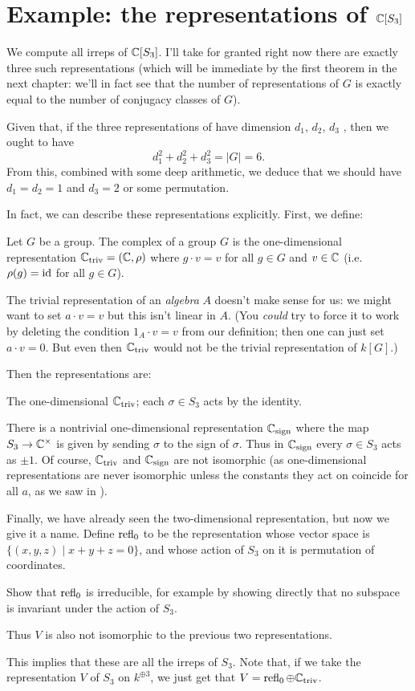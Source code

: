 \section{Example: the representations of $\mathbb C[S_3]$}
We compute all irreps of $\mathbb C[S_3]$.
I'll take for granted right now there are exactly three such representations
(which will be immediate by the first theorem in the next chapter:
we'll in fact see that the number of representations of $G$
is exactly equal to the number of conjugacy classes of $G$).

Given that, if the three representations of have dimension $d_1$, $d_2$, $d_3$ ,
then we ought to have
\[ d_1^2 + d_2^2 + d_3^2 = |G| = 6. \]
From this, combined with some deep arithmetic,
we deduce that we should have $d_1 = d_2 = 1$ and $d_3 = 2$
or some permutation.

In fact, we can describe these representations explicitly.
First, we define:
\begin{definition}
	Let $G$ be a group.
	The complex  of a group $G$
	is the one-dimensional representation $\mathbb C_{\mathrm{triv}} = (\mathbb C, \rho)$
	where $g \cdot v = v$ for all $g \in G$ and $v \in \mathbb C$
	(i.e.\ $\rho(g) = \mathrm{id}$ for all $g \in G$).
\end{definition}
\begin{remark}
	[Warning] The trivial representation of an \emph{algebra} $A$
	doesn't make sense for us:
	we might want to set $a \cdot v = v$ but this isn't linear in $A$.
	(You \emph{could} try to force it to work by
	deleting the condition $1_A \cdot v = v$ from our definition;
	then one can just set $a \cdot v = 0$.
	But even then $\mathbb C_{\mathrm{triv}}$ would not be the trivial representation of $k[G]$.)
\end{remark}

Then the representations are:
\begin{itemize}
	\ii The one-dimensional $\mathbb C_{\mathrm{triv}}$;
	each $\sigma \in S_3$ acts by the identity.

	\ii There is a nontrivial one-dimensional representation
	$\mathbb C_{\mathrm{sign}}$ where the map $S_3 \to \mathbb C^\times$ is given
	by sending $\sigma$ to the sign of $\sigma$.
	Thus in $\mathbb C_{\mathrm{sign}}$ every $\sigma \in S_3$ acts as $\pm 1$.
	Of course, $\mathbb C_{\mathrm{triv}}$ and $\mathbb C_{\mathrm{sign}}$ are not isomorphic
	(as one-dimensional representations are never isomorphic
	unless the constants they act on coincide for all $a$,
	as we saw in ).

	\ii Finally, we have already seen the two-dimensional representation,
	but now we give it a name.
	Define $\operatorname{refl}_0$ to be the representation whose vector space is
	$\{ (x,y,z) \mid x+y+z = 0 \}$,
	and whose action of $S_3$ on it is permutation of coordinates.
	\begin{exercise}
		Show that $\operatorname{refl}_0$ is irreducible, for example by showing directly
		that no subspace is invariant under the action of $S_3$.
	\end{exercise}
	Thus $V$ is also not isomorphic to the previous two representations.
\end{itemize}
This implies that these are all the irreps of $S_3$.
Note that, if we take the representation $V$ of $S_3$ on $k^{\oplus 3}$,
we just get that $V = \operatorname{refl}_0 \oplus \mathbb C_{\text{triv}}$.

